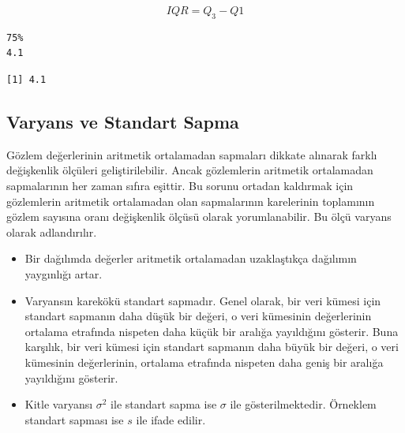 \documentclass[
  letterpaper,
  DIV=11,
  numbers=noendperiod]{scrreprt}
\newenvironment{Shaded}{\begin{snugshade}}{\end{snugshade}}
\newcommand{\AttributeTok}[1]{\textcolor[rgb]{0.40,0.45,0.13}{#1}}
\newcommand{\CommentTok}[1]{\textcolor[rgb]{0.37,0.37,0.37}{#1}}
\newcommand{\ConstantTok}[1]{\textcolor[rgb]{0.56,0.35,0.01}{#1}}
\newcommand{\FloatTok}[1]{\textcolor[rgb]{0.68,0.00,0.00}{#1}}
\newcommand{\FunctionTok}[1]{\textcolor[rgb]{0.28,0.35,0.67}{#1}}
\newcommand{\NormalTok}[1]{\textcolor[rgb]{0.00,0.23,0.31}{#1}}
\newcommand{\OtherTok}[1]{\textcolor[rgb]{0.00,0.23,0.31}{#1}}
\newcommand{\SpecialCharTok}[1]{\textcolor[rgb]{0.37,0.37,0.37}{#1}}
\begin{document}
\[IQR=Q_3-Q1\]

\begin{Shaded}
\end{Shaded}

\begin{verbatim}
75% 
4.1 
\end{verbatim}

\begin{Shaded}
\end{Shaded}

\begin{verbatim}
[1] 4.1
\end{verbatim}

\subsection*{Varyans ve Standart Sapma}\label{varyans-ve-standart-sapma}

Gözlem değerlerinin aritmetik ortalamadan sapmaları dikkate alınarak
farklı değişkenlik ölçüleri geliştirilebilir. Ancak gözlemlerin
aritmetik ortalamadan sapmalarının her zaman sıfıra eşittir. Bu sorunu
ortadan kaldırmak için gözlemlerin aritmetik ortalamadan olan
sapmalarının karelerinin toplamının gözlem sayısına oranı değişkenlik
ölçüsü olarak yorumlanabilir. Bu ölçü varyans olarak adlandırılır.

\begin{itemize}
\item
  Bir dağılımda değerler aritmetik ortalamadan uzaklaştıkça dağılımın
  yaygınlığı artar.
\item
  Varyansın karekökü standart sapmadır. Genel olarak, bir veri kümesi
  için standart sapmanın daha düşük bir değeri, o veri kümesinin
  değerlerinin ortalama etrafında nispeten daha küçük bir aralığa
  yayıldığını gösterir. Buna karşılık, bir veri kümesi için standart
  sapmanın daha büyük bir değeri, o veri kümesinin değerlerinin,
  ortalama etrafında nispeten daha geniş bir aralığa yayıldığını
  gösterir.
\item
  Kitle varyansı \(\sigma^2\) ile standart sapma ise \(\sigma\) ile
  gösterilmektedir. Örneklem standart sapması ise \(s\) ile ifade
  edilir.
\end{itemize}
\end{document}
